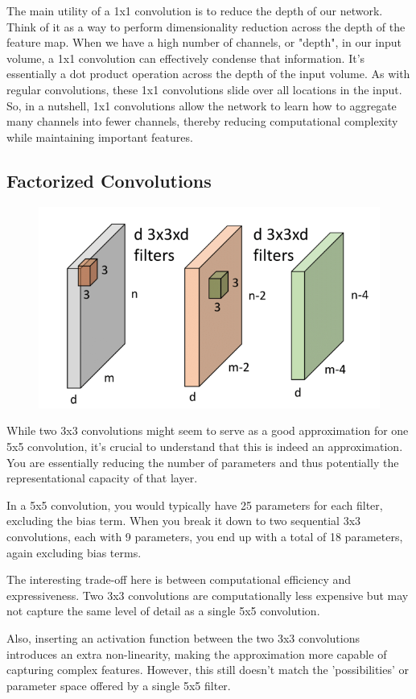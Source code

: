 \documentclass[11pt]{article}
\begin{document}
The main utility of a 1x1 convolution is to reduce the depth of our network. Think of it as a way to perform dimensionality reduction across the depth of the feature map. When we have a high number of channels, or "depth", in our input volume, a 1x1 convolution can effectively condense that information. It's essentially a dot product operation across the depth of the input volume. As with regular convolutions, these 1x1 convolutions slide over all locations in the input. So, in a nutshell, 1x1 convolutions allow the network to learn how to aggregate many channels into fewer channels, thereby reducing computational complexity while maintaining important features.

\subsection{Factorized Convolutions}

\begin{figure}[H]
    \centering
    \includegraphics[width=.6\linewidth]{figures/factorized-convolutions.png}
\end{figure}

While two 3x3 convolutions might seem to serve as a good approximation for one 5x5 convolution, it's crucial to understand that this is indeed an approximation. You are essentially reducing the number of parameters and thus potentially the representational capacity of that layer. 

In a 5x5 convolution, you would typically have 25 parameters for each filter, excluding the bias term. When you break it down to two sequential 3x3 convolutions, each with 9 parameters, you end up with a total of 18 parameters, again excluding bias terms. 

The interesting trade-off here is between computational efficiency and expressiveness. Two 3x3 convolutions are computationally less expensive but may not capture the same level of detail as a single 5x5 convolution. 

Also, inserting an activation function between the two 3x3 convolutions introduces an extra non-linearity, making the approximation more capable of capturing complex features. However, this still doesn't match the 'possibilities' or parameter space offered by a single 5x5 filter. 
\end{document}
